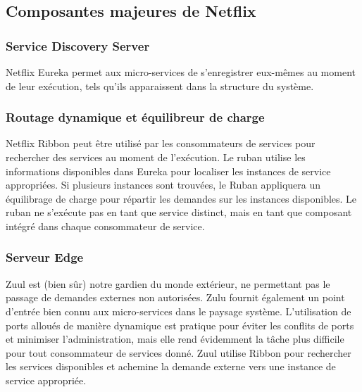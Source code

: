 \subsection{Composantes majeures de Netflix}



\subsubsection{Service Discovery Server} 

 Netflix Eureka permet aux micro-services de s’enregistrer eux-mêmes au moment de leur exécution, tels qu’ils apparaissent dans la structure du système.
\parencite{MicroServices}


\subsubsection{Routage dynamique et équilibreur de charge} 

  Netflix Ribbon peut être utilisé par les consommateurs de services pour rechercher des services au moment de l’exécution. Le ruban utilise les informations disponibles dans Eureka pour localiser les instances de service appropriées. Si plusieurs instances sont trouvées, le Ruban appliquera un équilibrage de charge pour répartir les demandes sur les instances disponibles. Le ruban ne s'exécute pas en tant que service distinct, mais en tant que composant intégré dans chaque consommateur de service.\parencite{MicroServices}





\subsubsection{Serveur Edge} 

  Zuul est (bien sûr) notre gardien du monde extérieur, ne permettant pas le passage de demandes externes non autorisées. Zulu fournit également un point d'entrée bien connu aux micro-services dans le paysage système. L'utilisation de ports alloués de manière dynamique est pratique pour éviter les conflits de ports et minimiser l'administration, mais elle rend évidemment la tâche plus difficile pour tout consommateur de services donné. Zuul utilise Ribbon pour rechercher les services disponibles et achemine la demande externe vers une instance de service appropriée.\parencite{MicroServices}


